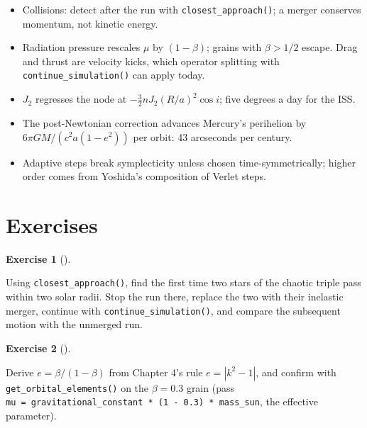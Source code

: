 \documentclass[
  10.5pt,
  letterpaper,
]{scrbook}
\providecommand{\tightlist}{%
  \setlength{\itemsep}{0pt}\setlength{\parskip}{0pt}}
\theoremstyle{definition}
\newtheorem{exercise}{Exercise}[chapter]
\theoremstyle{plain}
\theoremstyle{remark}
\begin{document}
\begin{tcolorbox}[enhanced jigsaw, arc=.35mm, bottomrule=.15mm, bottomtitle=1mm, breakable, colback=white, colbacktitle=quarto-callout-tip-color!10!white, colframe=quarto-callout-tip-color-frame, coltitle=black, left=2mm, leftrule=.75mm, opacityback=0, opacitybacktitle=0.6, rightrule=.15mm, title={Key results}, titlerule=0mm, toprule=.15mm, toptitle=1mm]

\begin{itemize}
\tightlist
\item
  Collisions: detect after the run with \texttt{closest\_approach()}; a
  merger conserves momentum, not kinetic energy.
\item
  Radiation pressure rescales \(\mu\) by \((1-\beta)\); grains with
  \(\beta > 1/2\) escape. Drag and thrust are velocity kicks, which
  operator splitting with \texttt{continue\_simulation()} can apply
  today.
\item
  \(J_2\) regresses the node at \(-\tfrac32 n J_2 (R/a)^2\cos i\); five
  degrees a day for the ISS.
\item
  The post-Newtonian correction advances Mercury's perihelion by
  \(6\pi GM/(c^2 a(1-e^2))\) per orbit: 43 arcseconds per century.
\item
  Adaptive steps break symplecticity unless chosen time-symmetrically;
  higher order comes from Yoshida's composition of Verlet steps.
\end{itemize}

\end{tcolorbox}

\section*{Exercises}\label{exercises-15}


\begin{exercise}[]\protect\hypertarget{exr-ch16-merge}{}\label{exr-ch16-merge}

Using \texttt{closest\_approach()}, find the first time two stars of the
chaotic triple pass within two solar radii. Stop the run there, replace
the two with their inelastic merger, continue with
\texttt{continue\_simulation()}, and compare the subsequent motion with
the unmerged run.

\end{exercise}

\begin{exercise}[]\protect\hypertarget{exr-ch16-beta}{}\label{exr-ch16-beta}

Derive \(e = \beta/(1-\beta)\) from Chapter 4's rule \(e = |k^2-1|\),
and confirm with \texttt{get\_orbital\_elements()} on the
\(\beta = 0.3\) grain (pass
\texttt{mu\ =\ gravitational\_constant\ *\ (1\ -\ 0.3)\ *\ mass\_sun},
the effective parameter).

\end{exercise}
\end{document}
